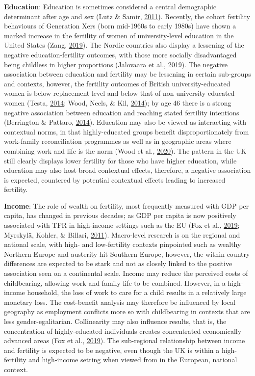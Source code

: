 \documentclass[12pt,twoside]{reedthesis}
\begin{document}
\textbf{Education}: Education is sometimes considered a central demographic determinant after age and sex (Lutz \& Samir, \protect\hyperlink{ref-lutz2011}{2011}). Recently, the cohort fertility behaviours of Generation Xers (born mid-1960s to early 1980s) have shown a marked increase in the fertility of women of university-level education in the United States (Zang, \protect\hyperlink{ref-zang2019}{2019}). The Nordic countries also display a lessening of the negative education-fertility outcomes, with those more socially disadvantaged being childless in higher proportions (Jalovaara et al., \protect\hyperlink{ref-jalovaara2019}{2019}). The negative association between education and fertility may be lessening in certain sub-groups and contexts, however, the fertility outcomes of British university-educated women is below replacement level and below that of non-university educated women (Testa, \protect\hyperlink{ref-testa2014}{2014}; Wood, Neels, \& Kil, \protect\hyperlink{ref-wood2014}{2014}); by age 46 there is a strong negative association between education and reaching stated fertility intentions (Berrington \& Pattaro, \protect\hyperlink{ref-berrington2014}{2014}). Education may also be viewed as interacting with contextual norms, in that highly-educated groups benefit disproportionately from work-family reconciliation programmes as well as in geographic areas where combining work and life is the norm (Wood et al., \protect\hyperlink{ref-wood2020}{2020}). The pattern in the UK still clearly displays lower fertility for those who have higher education, while education may also host broad contextual effects, therefore, a negative association is expected, countered by potential contextual effects leading to increased fertility.

\textbf{Income}: The role of wealth on fertility, most frequently measured with GDP per capita, has changed in previous decades; as GDP per capita is now positively associated with TFR in high-income settings such as the EU (Fox et al., \protect\hyperlink{ref-fox2019}{2019}; Myrskylä, Kohler, \& Billari, \protect\hyperlink{ref-myrskyla2011a}{2011}). Macro-level research is on the regional and national scale, with high- and low-fertility contexts pinpointed such as wealthy Northern Europe and austerity-hit Southern Europe, however, the within-country differences are expected to be stark and not as closely linked to the positive association seen on a continental scale. Income may reduce the perceived costs of childbearing, allowing work and family life to be combined. However, in a high-income household, the loss of work to care for a child results in a relatively large monetary loss. The cost-benefit analysis may therefore be influenced by local geography as employment conflicts more so with childbearing in contexts that are less gender-egalitarian. Collinearity may also influence results, that is, the concentration of highly-educated individuals creates concentrated economically advanced areas (Fox et al., \protect\hyperlink{ref-fox2019}{2019}). The sub-regional relationship between income and fertility is expected to be negative, even though the UK is within a high-fertility and high-income setting when viewed from in the European, national context.
\end{document}
